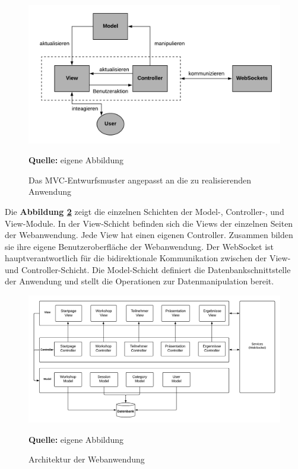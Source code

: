 \begin{figure}[H]
  \begin{center}
    \includegraphics[scale=0.55]{img/blank_diagramm}
	\caption{Das MVC-Entwurfsmuster angepasst an die zu realisierenden Anwendung} 
	\footnotesize\sffamily\textbf{Quelle:} eigene Abbildung
	\label{fig:mvc_anwendung}
  \end{center}   
\end{figure}

Die \textbf{Abbildung \ref{fig:web architektur}} zeigt die einzelnen Schichten der Model-, Controller-,  und View-Module. In der View-Schicht befinden sich die Views der einzelnen Seiten der Webanwendung. Jede View hat einen eigenen Controller. Zusammen bilden sie ihre eigene Benutzeroberfläche der Webanwendung. Der WebSocket ist hauptverantwortlich für die bidirektionale Kommunikation zwischen der View- und Controller-Schicht. Die Model-Schicht definiert die Datenbankschnittstelle der Anwendung und stellt die Operationen zur Datenmanipulation bereit.

\begin{figure}[H]
  \begin{center}
    \includegraphics[scale=0.4]{img/web_architektur}
	\caption{Architektur der Webanwendung} 
	\footnotesize\sffamily\textbf{Quelle:} eigene Abbildung
	\label{fig:web architektur}
  \end{center}   
\end{figure}

